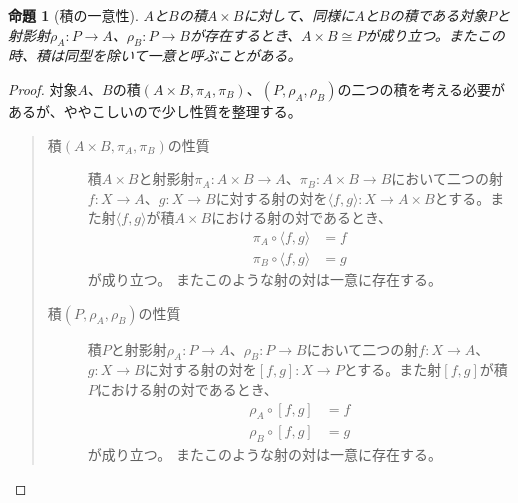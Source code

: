 \documentclass[dvipdfmx]{jsarticle}
\newcommand{\arrow}{\rightarrow}
\newcommand{\tuple}[1]{\langle #1\rangle}
\newcommand{\mor}[3]{#1:#2\arrow #3}
\newtheorem{proof}{証明}[section]
\newtheorem{prop}{命題}[section]
\numberwithin{proof}{subsection}
\numberwithin{prop}{subsection}
\numberwithin{define}{subsection}
\begin{document}
	\begin{prop}[積の一意性]
		$A$と$B$の積$A\times B$に対して、同様に$A$と$B$の積である対象$P$と射影射$\mor{\rho_A}{P}{A}$、$\mor{\rho_B}{P}{B}$が存在するとき、$A\times B\cong P$が成り立つ。またこの時、積は同型を除いて一意と呼ぶことがある。
	\end{prop}
	\begin{proof}
		対象$A$、$B$の積$(A\times B,\pi_A,\pi_B)$、$(P,\rho_A,\rho_B)$の二つの積を考える必要があるが、ややこしいので少し性質を整理する。
		\begin{quote}
			\begin{description}
				\item[積$(A\times B,\pi_A,\pi_B)$の性質]
				積$A\times B$と射影射$\mor{\pi_A}{A\times B}{A}$、$\mor{\pi_B}{A\times B}{B}$において二つの射$\mor{f}{X}{A}$、$\mor{g}{X}{B}$に対する射の対を$\mor{\tuple{f,g}}{X}{A\times B}$とする。また射$\tuple{f,g}$が積$A\times B$における射の対であるとき、
				\begin{align*}
					\pi_A\circ\tuple{f,g}&=f\\
					\pi_B\circ\tuple{f,g}&=g
				\end{align*}
				が成り立つ。
				またこのような射の対は一意に存在する。
				\begin{center}
				\end{center}
				\item[積$(P,\rho_A,\rho_B)$の性質]
				積$P$と射影射$\mor{\rho_A}{P}{A}$、$\mor{\rho_B}{P}{B}$において二つの射$\mor{f}{X}{A}$、$\mor{g}{X}{B}$に対する射の対を$\mor{[f,g]}{X}{P}$とする。また射$[f,g]$が積$P$における射の対であるとき、
				\begin{align*}
					\rho_A\circ[f,g]&=f\\
					\rho_B\circ[f,g]&=g
				\end{align*}
				が成り立つ。
				またこのような射の対は一意に存在する。
				\begin{center}
				\end{center}
			\end{description}


\end{quote}
\end{proof}
\end{document}
